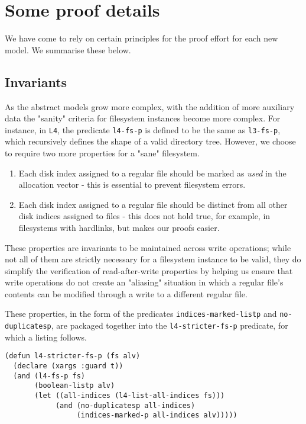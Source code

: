 \documentclass[submission,copyright,creativecommons]{eptcs}
\begin{document}
\section{Some proof details}

We have come to rely on certain principles for the proof effort for
each new model. We summarise these below.

\subsection{Invariants}

As the abstract models grow more complex, with the addition of more
auxiliary data the "sanity" criteria for filesystem instances become more
complex. For instance, in \texttt{L4}, the predicate \texttt{l4-fs-p}
is defined to be the same as \texttt{l3-fs-p}, which recursively
defines the shape of a valid directory tree. However, we choose to
require two more properties for a "sane" filesystem.

\begin{enumerate}
\item Each disk index assigned to a regular file should be
  marked as \textit{used} in the allocation vector - this is essential
  to prevent filesystem errors.
\item Each disk index assigned to a regular file should be distinct
  from all other disk indices assigned to files - this does not hold
  true, for example, in filesystems with hardlinks, but makes our
  proofs easier.
\end{enumerate}

These properties are invariants to be maintained across
write operations; while not all of them are strictly necessary for a
filesystem instance to be valid, they do simplify the verification of
read-after-write properties by helping us ensure that write operations
do not create an "aliasing" situation in which a regular file's
contents can be modified through a write to a different regular file.

These properties, in the form of the predicates
\texttt{indices-marked-listp} and \texttt{no-duplicatesp}, are
packaged together into the \texttt{l4-stricter-fs-p} predicate, for
which a listing follows.

\medskip

\noindent
\begin{verbatim}
(defun l4-stricter-fs-p (fs alv)
  (declare (xargs :guard t))
  (and (l4-fs-p fs)
       (boolean-listp alv)
       (let ((all-indices (l4-list-all-indices fs)))
            (and (no-duplicatesp all-indices)
                 (indices-marked-p all-indices alv)))))
\end{verbatim}
\end{document}

